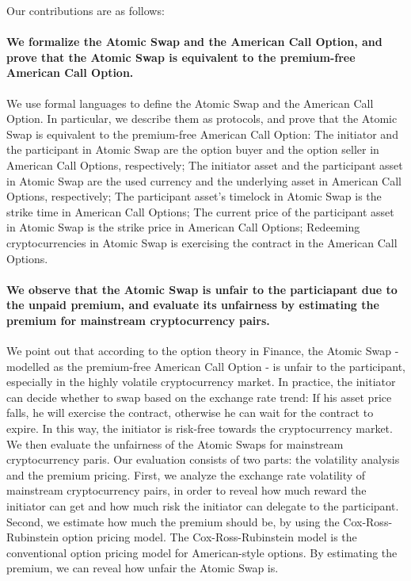 Our contributions are as follows:

\paragraph{We formalize the Atomic Swap and the American Call Option, and prove that the Atomic Swap is equivalent to the premium-free American Call Option.}
We use formal languages to define the Atomic Swap and the American Call Option.
In particular, we describe them as protocols, and prove that the Atomic Swap is equivalent to the premium-free American Call Option:
The initiator and the participant in Atomic Swap are the option buyer and the option seller in American Call Options, respectively;
The initiator asset and the participant asset in Atomic Swap are the used currency and the underlying asset in American Call Options, respectively;
The participant asset's timelock in Atomic Swap is the strike time in American Call Options;
The current price of the participant asset in Atomic Swap is the strike price in American Call Options;
Redeeming cryptocurrencies in Atomic Swap is exercising the contract in the American Call Options.

\paragraph{We observe that the Atomic Swap is unfair to the particiapant due to the unpaid premium, and evaluate its unfairness by estimating the premium for mainstream cryptocurrency pairs.}
We point out that according to the option theory in Finance, the Atomic Swap - modelled as the premium-free American Call Option - is unfair to the participant, especially in the highly volatile cryptocurrency market.
In practice, the initiator can decide whether to swap based on the exchange rate trend: If his asset price falls, he will exercise the contract, otherwise he can wait for the contract to expire.
In this way, the initiator is risk-free towards the cryptocurrency market. 
We then evaluate the unfairness of the Atomic Swaps for mainstream cryptocurrency paris.
Our evaluation consists of two parts: the volatility analysis and the premium pricing.
First, we analyze the exchange rate volatility of mainstream cryptocurrency pairs, in order to reveal how much reward the initiator can get and how much risk the initiator can delegate to the participant.
Second, we estimate how much the premium should be, by using the Cox-Ross-Rubinstein option pricing model.
The Cox-Ross-Rubinstein model is the conventional option pricing model for American-style options.
By estimating the premium, we can reveal how unfair the Atomic Swap is.

